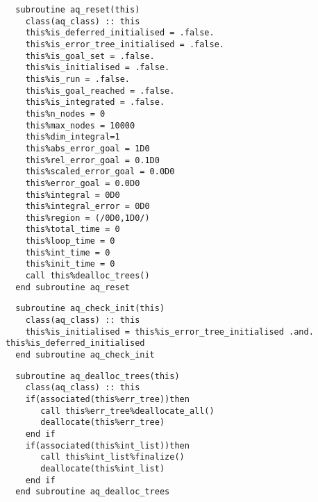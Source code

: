 \begin{Verbatim}
  subroutine aq_reset(this)
    class(aq_class) :: this
    this%is_deferred_initialised = .false.
    this%is_error_tree_initialised = .false.
    this%is_goal_set = .false.
    this%is_initialised = .false.
    this%is_run = .false.
    this%is_goal_reached = .false.
    this%is_integrated = .false.
    this%n_nodes = 0
    this%max_nodes = 10000
    this%dim_integral=1
    this%abs_error_goal = 1D0
    this%rel_error_goal = 0.1D0
    this%scaled_error_goal = 0.0D0
    this%error_goal = 0.0D0
    this%integral = 0D0
    this%integral_error = 0D0
    this%region = (/0D0,1D0/)
    this%total_time = 0
    this%loop_time = 0
    this%int_time = 0
    this%init_time = 0
    call this%dealloc_trees()
  end subroutine aq_reset
\end{Verbatim}
\begin{Verbatim}
  subroutine aq_check_init(this)
    class(aq_class) :: this
    this%is_initialised = this%is_error_tree_initialised .and. this%is_deferred_initialised
  end subroutine aq_check_init
\end{Verbatim}
\begin{Verbatim}
  subroutine aq_dealloc_trees(this)
    class(aq_class) :: this
    if(associated(this%err_tree))then
       call this%err_tree%deallocate_all()
       deallocate(this%err_tree)
    end if
    if(associated(this%int_list))then
       call this%int_list%finalize()
       deallocate(this%int_list)
    end if
  end subroutine aq_dealloc_trees
\end{Verbatim}

